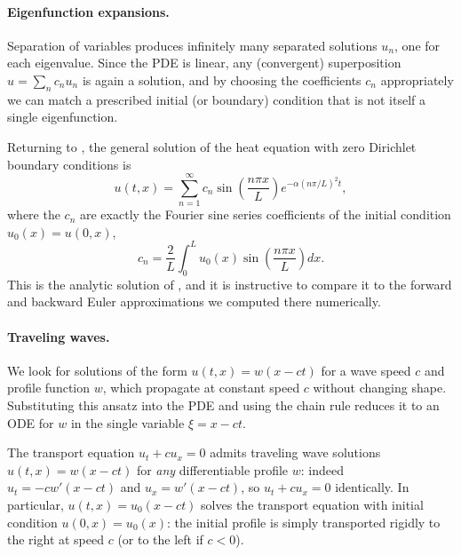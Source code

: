 \paragraph{Eigenfunction expansions.}
Separation of variables produces infinitely many separated solutions
$u_n$, one for each eigenvalue. Since the PDE is linear, any
(convergent) superposition $u = \sum_n c_n u_n$ is again a solution,
and by choosing the coefficients $c_n$ appropriately we can match a
prescribed initial (or boundary) condition that is not itself a single
eigenfunction.

\begin{example}
    Returning to , the general solution of the
    heat equation with zero Dirichlet boundary conditions is
    \begin{equation*}
        u(t,x) = \sum_{n=1}^\infty c_n \sin\left( \frac{n\pi x}{L}
        \right) e^{-\alpha (n\pi/L)^2 t},
    \end{equation*}
    where the $c_n$ are exactly the Fourier sine series coefficients of
    the initial condition $u_0(x) = u(0,x)$,
    \begin{equation*}
        c_n = \frac{2}{L} \int_0^L u_0(x) \sin\left( \frac{n\pi x}{L}
        \right) dx.
    \end{equation*}
    This is the analytic solution of , and it is
    instructive to compare it to the forward and backward Euler
    approximations we computed there numerically.
\end{example}

\paragraph{Traveling waves.}
We look for solutions of the form $u(t,x) = w(x-ct)$ for a wave speed
$c$ and profile function $w$, which propagate at constant speed $c$
without changing shape. Substituting this ansatz into the PDE and
using the chain rule reduces it to an ODE for $w$ in the single
variable $\xi = x-ct$.

\begin{example}
    The transport equation $u_t + cu_x = 0$ admits traveling wave
    solutions $u(t,x) = w(x-ct)$ for \emph{any} differentiable profile
    $w$: indeed $u_t = -cw'(x-ct)$ and $u_x = w'(x-ct)$, so $u_t + cu_x
    = 0$ identically. In particular, $u(t,x) = u_0(x-ct)$ solves the
    transport equation with initial condition $u(0,x) = u_0(x)$: the
    initial profile is simply transported rigidly to the right at
    speed $c$ (or to the left if $c<0$).
\end{example}

